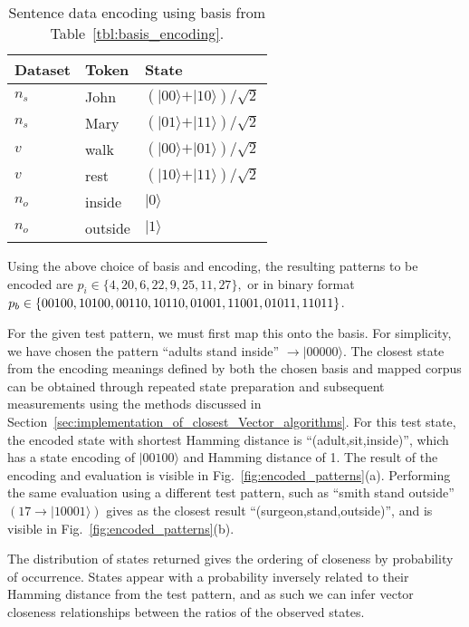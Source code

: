\begin{table}[h!]
    \centering
    \begin{tabular}{ |p{3cm}|p{3cm}|p{3cm}| }
        \textbf{Dataset} & \textbf{Token} & \textbf{State}\\
        \hline
        {$n_s$} & {John} & $(\vert 00 \rangle + \vert 10 \rangle)/\sqrt{2}$ \\
        {$n_s$} & {Mary} & $(\vert 01 \rangle + \vert 11 \rangle)/\sqrt{2}$ \\
        \hline
        {$v$} & {walk} & $(\vert 00 \rangle + \vert 01 \rangle)/\sqrt{2}$ \\
        {$v$} & {rest} & $(\vert 10 \rangle + \vert 11 \rangle)/\sqrt{2}$ \\
        \hline
        {$n_o$} & {inside} & $\vert 0 \rangle$  \\
        {$n_o$} & {outside} & $\vert 1 \rangle$  \\
        \hline
    \end{tabular}
    \caption{Sentence data encoding using basis from Table~\ref{tbl:basis_encoding}.}
    \label{tbl:sentence_encoded}
\end{table}

Using the above choice of basis and encoding, the resulting patterns to be encoded are $p_i \in \{4, 20, 6, 22, 9, 25, 11, 27\},$ or in binary format $p_b \in \{00100, 10100, 00110, 10110, 01001, \\11001, 01011, 11011\}$.

For the given test pattern, we must first map this onto the basis. For simplicity, we have chosen the pattern ``adults stand inside'' $\rightarrow \vert 00000\rangle$. The closest state from the encoding meanings defined by both the chosen basis and mapped corpus can be obtained through repeated state preparation and subsequent measurements using the methods discussed in Section~\ref{sec:implementation_of_closest_Vector_algorithms}. For this test state, the encoded state with shortest Hamming distance is ``(adult,sit,inside)'', which has a state encoding of $\vert 00100 \rangle$ and Hamming distance of 1. The result of the encoding and evaluation is visible in Fig.~\ref{fig:encoded_patterns}(a). Performing the same evaluation using a different test pattern, such as ``smith stand outside'' $( 17 \rightarrow \vert 10001\rangle)$ gives as the closest result ``(surgeon,stand,outside)'', and is visible in Fig.~\ref{fig:encoded_patterns}(b).

The distribution of states returned gives the ordering of closeness by probability of occurrence. States appear with a probability inversely related to their Hamming distance from the test pattern, and as such we can infer vector closeness relationships between the ratios of the observed states.

